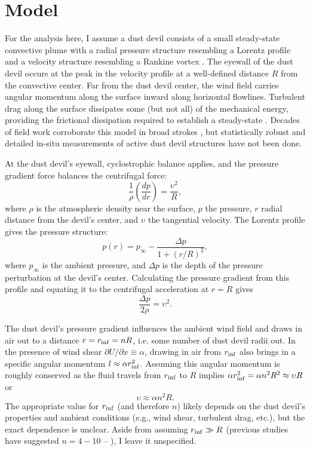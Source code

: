 \documentclass{aastex63}
\begin{document}
\section{Model} \label{sec:model}
For the analysis here, I assume a dust devil consists of a small steady-state convective plume with a radial pressure structure resembling a Lorentz profile and a velocity structure resembling a Rankine vortex \citep{2016SSRv..203..209K}. The eyewall of the dust devil occurs at the peak in the velocity profile at a well-defined distance $R$ from the convective center. Far from the dust devil center, the wind field carries angular momentum along the surface inward along horizontal flowlines. Turbulent drag along the surface dissipates some (but not all) of the mechanical energy, providing the frictional dissipation required to establish a steady-state \citep{1998JAtS...55.3244R}. Decades of field work corroborate this model in broad strokes \citep[e.g.][]{2016SSRv..203...39M}, but statistically robust and detailed in-situ measurements of active dust devil structures have not been done.

At the dust devil's eyewall, cyclostrophic balance applies, and the pressure gradient force balances the centrifugal force:
\begin{equation}
    \dfrac{1}{\rho}\left( \dfrac{dp}{dr} \right) = \dfrac{\upsilon^2}{R},
\end{equation}
where $\rho$ is the atmospheric density near the surface, $p$ the pressure, $r$ radial distance from the devil's center, and $\upsilon$ the tangential velocity. The Lorentz profile gives the pressure structure:
\begin{equation}
    p(r) = p_{\infty} - \dfrac{\Delta p}{1 + \left( r/R \right)^2},\label{eqn:pressure_profile}
\end{equation}
where $p_{\infty}$ is the ambient pressure, and $\Delta p$ is the depth of the pressure perturbation at the devil's center. Calculating the pressure gradient from this profile and equating it to the centrifugal acceleration at $r = R$ gives
\begin{equation}
    \dfrac{\Delta p}{2\rho} = \upsilon^2.\label{eqn:cyclostrophic_balance}
\end{equation}

The dust devil's pressure gradient influences the ambient wind field and draws in air out to a distance $r = r_{\rm inf} = n R$, i.e. some number of dust devil radii out. In the presence of wind shear $\partial U/\partial x \equiv \alpha$, drawing in air from $r_{\rm inf}$ also brings in a specific angular momentum $l \approx \alpha r_{\rm inf}^2$. Assuming this angular momentum is roughly conserved as the fluid travels from $r_{\rm inf}$ to $R$ implies $\alpha r_{\rm inf}^2 = \alpha n^2 R^2 \approx \upsilon R$ or 
\begin{equation}
    \upsilon \approx \alpha n^2 R.
\end{equation}
The appropriate value for $r_{\rm inf}$ (and therefore $n$) likely depends on the dust devil's properties and ambient conditions (e.g., wind shear, turbulent drag, etc.), but the exact dependence is unclear. Aside from assuming $r_{\rm inf} \gg R$ (previous studies have suggested $n = 4-10$ -- \citealp{2001JAtS...58..927R}), I leave it unspecified.
\end{document}
